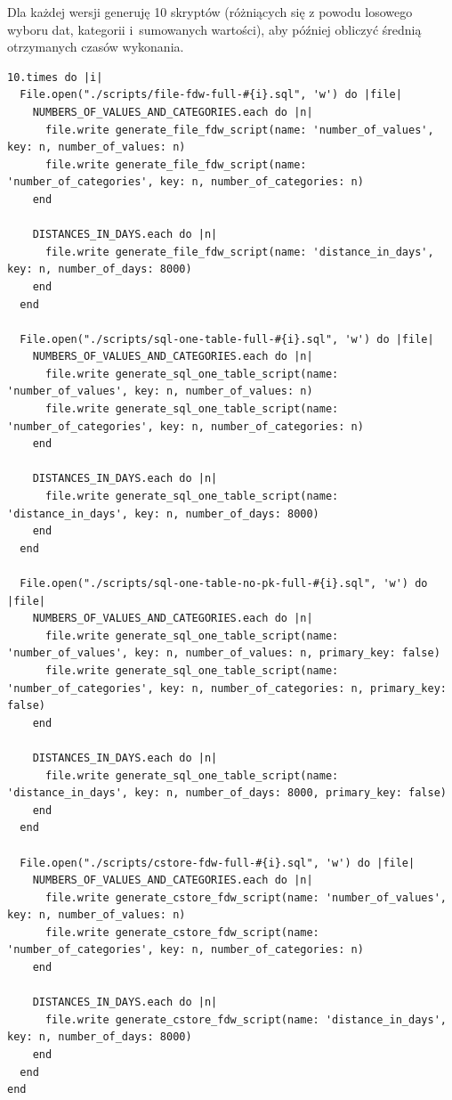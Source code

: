 \documentclass[a4paper,11pt]{article}
\begin{document}
Dla każdej wersji generuję 10 skryptów (różniących się z powodu losowego wyboru dat, kategorii i~sumowanych wartości),
aby później obliczyć średnią otrzymanych czasów wykonania.
\begin{lstlisting}
10.times do |i|
  File.open("./scripts/file-fdw-full-#{i}.sql", 'w') do |file|
    NUMBERS_OF_VALUES_AND_CATEGORIES.each do |n|
      file.write generate_file_fdw_script(name: 'number_of_values', key: n, number_of_values: n)
      file.write generate_file_fdw_script(name: 'number_of_categories', key: n, number_of_categories: n)
    end

    DISTANCES_IN_DAYS.each do |n|
      file.write generate_file_fdw_script(name: 'distance_in_days', key: n, number_of_days: 8000)
    end
  end

  File.open("./scripts/sql-one-table-full-#{i}.sql", 'w') do |file|
    NUMBERS_OF_VALUES_AND_CATEGORIES.each do |n|
      file.write generate_sql_one_table_script(name: 'number_of_values', key: n, number_of_values: n)
      file.write generate_sql_one_table_script(name: 'number_of_categories', key: n, number_of_categories: n)
    end

    DISTANCES_IN_DAYS.each do |n|
      file.write generate_sql_one_table_script(name: 'distance_in_days', key: n, number_of_days: 8000)
    end
  end

  File.open("./scripts/sql-one-table-no-pk-full-#{i}.sql", 'w') do |file|
    NUMBERS_OF_VALUES_AND_CATEGORIES.each do |n|
      file.write generate_sql_one_table_script(name: 'number_of_values', key: n, number_of_values: n, primary_key: false)
      file.write generate_sql_one_table_script(name: 'number_of_categories', key: n, number_of_categories: n, primary_key: false)
    end

    DISTANCES_IN_DAYS.each do |n|
      file.write generate_sql_one_table_script(name: 'distance_in_days', key: n, number_of_days: 8000, primary_key: false)
    end
  end

  File.open("./scripts/cstore-fdw-full-#{i}.sql", 'w') do |file|
    NUMBERS_OF_VALUES_AND_CATEGORIES.each do |n|
      file.write generate_cstore_fdw_script(name: 'number_of_values', key: n, number_of_values: n)
      file.write generate_cstore_fdw_script(name: 'number_of_categories', key: n, number_of_categories: n)
    end

    DISTANCES_IN_DAYS.each do |n|
      file.write generate_cstore_fdw_script(name: 'distance_in_days', key: n, number_of_days: 8000)
    end
  end
end
\end{lstlisting}
\end{document}
